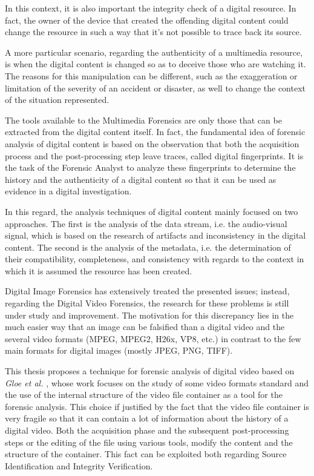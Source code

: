 In this context, it is also important the integrity check of a digital resource. In fact, the owner of the device that created the offending digital content could change the resource in such a way that it's not possible to trace back its source.

A more particular scenario, regarding the authenticity of a multimedia resource, is when the digital content is changed so as to deceive those who are watching it. The reasons for this manipulation can be different, such as the exaggeration or limitation of the severity of an accident or disaster, as well to change the context of the situation represented.

The tools available to the Multimedia Forensics are only those that can be extracted from the digital content itself. In fact, the fundamental idea of forensic analysis of digital content is based on the observation that both the acquisition process and the post-processing step leave traces, called digital fingerprints. It is the task of the Forensic Analyst to analyze these fingerprints to determine the history and the authenticity of a digital content so that it can be used as evidence in a digital investigation.

In this regard, the analysis techniques of digital content mainly focused on two approaches. The first is the analysis of the data stream, i.e. the audio-visual signal, which is based on the research of artifacts and inconsistency in the digital content. The second is the analysis of the metadata, i.e. the determination of their compatibility, completeness, and consistency \cite{Piva} with regards to the context in which it is assumed the resource has been created.

Digital Image Forensics has extensively treated the presented issues; instead, regarding the Digital Video Forensics, the research for these problems is still under study and improvement. The motivation for this discrepancy lies in the much easier way that an image can be falsified than a digital video and the several video formats (MPEG, MPEG2, H26x, VP8, etc.) in contrast to the few main formats for digital images (mostly JPEG, PNG, TIFF).

This thesis proposes a technique for forensic analysis of digital video based on \emph{Gloe et al.} \cite{Gloe2014S68}, whose work focuses on the study of some video formats standard and the use of the internal structure of the video file container as a tool for the forensic analysis. This choice if justified by the fact that the video file container is very fragile so that it can contain a lot of information about the history of a digital video. Both the acquisition phase and the subsequent post-processing steps or the editing of the file using various tools, modify the content and the structure of the container. This fact can be exploited both regarding Source Identification and Integrity Verification.

